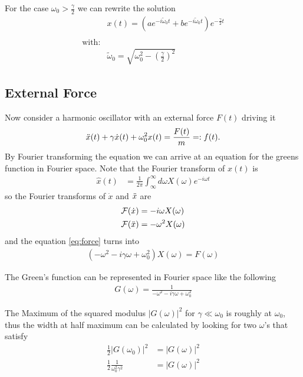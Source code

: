 \documentclass[a4paper]{article}
\begin{document}
For the case $\omega_0 > \frac{\gamma}{2}$ we can rewrite the solution
\begin{align}
    &x(t) = \left(a e^{-i\tilde{\omega}_0 t} + b e^{-i\tilde{\omega}_0
    t}\right) e^{-\frac{\gamma}{2}t}\\
    &\nonumber \\
    \text{with:} \nonumber\\
    &\tilde{\omega}_{0} = \sqrt{\omega_0^2 - \left(\frac{\gamma}{2}\right)^2}
\end{align}
\subsection{External Force}

Now consider a harmonic oscillator with an external force $F(t)$ driving it
\begin{align}\label{eq:force}
    \Ddot{x}(t)+\gamma\Dot{x}(t)+\omega_0^2x(t)=\frac{F(t)}{m} =: f(t).
\end{align}
By Fourier transforming the equation we can arrive at an equation for the
greens function in Fourier space. Note that the Fourier transform of
$x(t)$ is
\begin{align}
   \hat{x}(t) &= \frac{1}{2\pi}\int_\infty^\infty d\omega
    X(\omega) e^{-i\omega t}
\end{align}
so the Fourier transforms of $\dot{x}$ and $\Ddot{x}$ are
\begin{align}
    \mathcal{F}(\dot{x}) &= -i\omega X(\omega)\\
    \mathcal{F}(\Ddot{x}) &= -\omega^2 X(\omega)\\
\end{align}
and the equation \ref{eq:force} turns into
\begin{align}
    (-\omega^2 - i\gamma \omega + \omega_0^2) X(\omega) = F(\omega)
\end{align}

The Green's function can be represented in Fourier space like the following
\begin{align}
    G(\omega)= \frac{1}{-\omega^2 - i\gamma \omega + \omega_0^2}
\end{align}

The Maximum of the squared modulus $|G(\omega)|^2$ for $\gamma \ll \omega_0$ is
roughly at $\omega_0$, thus the width at half maximum can be calculated by
looking for two $\omega$'s that satisfy
\begin{align}
    \frac{1}{2}|G(\omega_0)|^2 &= |G(\omega)|^2\\
    \frac{1}{2} \frac{1}{\omega_0^2\gamma^2} &= |G(\omega)|^2
\end{align}
\end{document}
